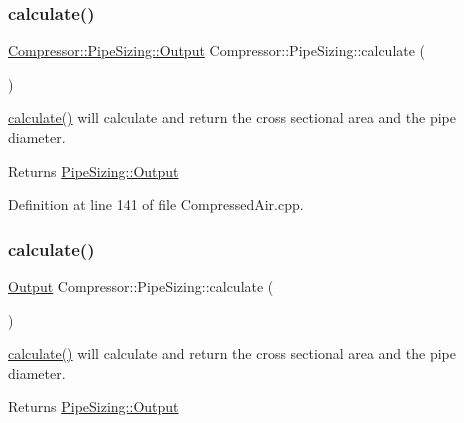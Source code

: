 \subsubsection{\texorpdfstring{calculate()}{calculate()}\hspace{0.1cm}{\footnotesize\ttfamily [1/3]}}
{\footnotesize\ttfamily \hyperlink{struct_compressor_1_1_pipe_sizing_1_1_output}{Compressor\+::\+Pipe\+Sizing\+::\+Output} Compressor\+::\+Pipe\+Sizing\+::calculate (\begin{DoxyParamCaption}{ }\end{DoxyParamCaption})}

\hyperlink{class_compressor_1_1_pipe_sizing_a9212c8d52ff658c412752cee18d6b28d}{calculate()} will calculate and return the cross sectional area and the pipe diameter. \begin{DoxyReturn}{Returns}
\hyperlink{struct_compressor_1_1_pipe_sizing_1_1_output}{Pipe\+Sizing\+::\+Output} 
\end{DoxyReturn}


Definition at line 141 of file Compressed\+Air.\+cpp.

\mbox{\label{class_compressor_1_1_pipe_sizing_a0b4a10531fb9a8c3bb9aae0441ed5182}} 
\subsubsection{\texorpdfstring{calculate()}{calculate()}\hspace{0.1cm}{\footnotesize\ttfamily [2/3]}}
{\footnotesize\ttfamily \hyperlink{struct_compressor_1_1_pipe_sizing_1_1_output}{Output} Compressor\+::\+Pipe\+Sizing\+::calculate (\begin{DoxyParamCaption}{ }\end{DoxyParamCaption})}

\hyperlink{class_compressor_1_1_pipe_sizing_a9212c8d52ff658c412752cee18d6b28d}{calculate()} will calculate and return the cross sectional area and the pipe diameter. \begin{DoxyReturn}{Returns}
\hyperlink{struct_compressor_1_1_pipe_sizing_1_1_output}{Pipe\+Sizing\+::\+Output} 
\end{DoxyReturn}
\mbox{\label{class_compressor_1_1_pipe_sizing_a0b4a10531fb9a8c3bb9aae0441ed5182}} 
